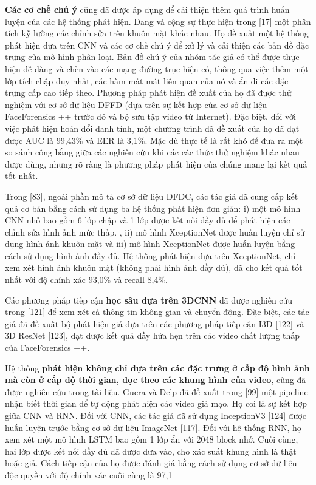 \documentclass{article}
\begin{document}
\textbf{Các cơ chế chú ý} cũng đã được áp dụng để cải thiện thêm quá trình huấn luyện của các hệ thống phát hiện. Dang và cộng sự thực hiện trong [17] một phân tích kỹ lưỡng các chỉnh sửa trên khuôn mặt khác nhau. Họ đề xuất một hệ thống phát hiện dựa trên CNN và các cơ chế chú ý để xử lý và cải thiện các bản đồ đặc trưng của mô hình phân loại. Bản đồ chú ý của nhóm tác giả có thể được thực hiện dễ dàng và chèn vào các mạng đường trục hiện có, thông qua việc thêm một lớp tích chập duy nhất, các hàm mất mát liên quan của nó và ẩn đi các đặc trưng cấp cao tiếp theo. Phương pháp phát hiện đề xuất của họ đã được thử nghiệm với cơ sở dữ liệu DFFD (dựa trên sự kết hợp của cơ sở dữ liệu FaceForensics ++ trước đó và bộ sưu tập video từ Internet). Đặc biệt, đối với việc phát hiện hoán đổi danh tính, một chương trình đã đề xuất của họ đã đạt được AUC là 99,43\% và EER là 3,1\%. Mặc dù thực tế là rất khó để đưa ra một so sánh công bằng giữa các nghiên cứu khi các các thức thử nghiệm khác nhau được dùng, nhưng rõ ràng là phương pháp phát hiện của chúng mang lại kết quả tốt nhất.

Trong [83], ngoài phần mô tả cơ sở dữ liệu DFDC, các tác giả đã cung cấp kết quả cơ bản bằng cách sử dụng ba hệ thống phát hiện đơn giản: i) một mô hình CNN nhỏ bao gồm 6 lớp chập và 1 lớp được kết nối đầy đủ để phát hiện các chỉnh sửa hình ảnh mức thấp. , ii) mô hình XceptionNet được huấn luyện chỉ sử dụng hình ảnh khuôn mặt và iii) mô hình XceptionNet được huấn luyện bằng cách sử dụng hình ảnh đầy đủ. Hệ thống phát hiện dựa trên XceptionNet, chỉ xem xét hình ảnh khuôn mặt (không phải hình ảnh đầy đủ), đã cho kết quả tốt nhất với độ chính xác 93,0\% và recall 8,4\%.

Các phương pháp tiếp cận \textbf{học sâu dựa trên 3DCNN} đã được nghiên cứu trong [121] để xem xét cả thông tin không gian và chuyển động. Đặc biệt, các tác giả đã đề xuất bộ phát hiện giả dựa trên các phương pháp tiếp cận I3D [122] và 3D ResNet [123], đạt được kết quả đầy hứa hẹn trên các video chất lượng thấp của FaceForensics ++.

Hệ thống \textbf{phát hiện không chỉ dựa trên các đặc trưng ở cấp độ hình ảnh mà còn ở cấp độ thời gian, dọc theo các khung hình của video}, cũng đã được nghiên cứu trong tài liệu. Guera và Delp đã đề xuất trong [99] một pipeline nhận biết thời gian để tự động phát hiện các video giả mạo. Họ coi là sự kết hợp giữa CNN và RNN. Đối với CNN, các tác giả đã sử dụng InceptionV3 [124] được huấn luyện trước bằng cơ sở dữ liệu ImageNet [117]. Đối với hệ thống RNN, họ xem xét một mô hình LSTM bao gồm 1 lớp ẩn với 2048 block nhớ. Cuối cùng, hai lớp được kết nối đầy đủ đã được đưa vào, cho xác suất khung hình là thật hoặc giả. Cách tiếp cận của họ được đánh giá bằng cách sử dụng cơ sở dữ liệu độc quyền với độ chính xác cuối cùng là 97,1%
\end{document}

